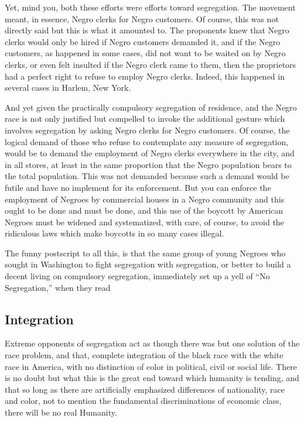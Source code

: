 \documentclass[letterpaper,10pt,english]{jupyterBook}
\begin{document}
\sphinxAtStartPar
Yet, mind you, both these efforts were efforts toward segregation. The movement meant, in essence, Negro clerks for Negro customers. Of course, this was not directly said but this is what it amounted to. The proponents knew that Negro clerks would only be hired if Negro customers demanded it, and if the Negro customers, as happened in some cases, did not want to be waited on by Negro clerks, or even felt insulted if the Negro clerk came to them, then the proprietors had a perfect right to refuse to employ Negro clerks. Indeed, this happened in several cases in Harlem, New York.

\sphinxAtStartPar
And yet given the practically compulsory segregation of residence, and the Negro race is not only justified but compelled to invoke the additional gesture which involves segregation by asking Negro clerks for Negro customers. Of course, the logical demand of those who refuse to contemplate any measure of segregation, would be to demand the employment of Negro clerks everywhere in the city, and in all stores, at least in the same proportion that the Negro population bears to the total population. This was not demanded because such a demand would be futile and have no implement for its enforcement. But you can enforce the employment of Negroes by commercial houses in a Negro community and this ought to be done and must be done, and this use of the boycott by American Negroes must be widened and systematized, with care, of course, to avoid the ridiculous laws which make boycotts in so many cases illegal.

\sphinxAtStartPar
The funny postscript to all this, is that the same group of young Negroes who sought in Washington to fight segregation with segregation, or better to build a decent living on compulsory segregation, immediately set up a yell of “No Segregation,” when they read 


\subsection{Integration}
\label{\detokenize{Volumes/41/04/segregation_in_the_north:integration}}
\sphinxAtStartPar
Extreme opponents of segregation act as though there was but one solution of the race problem, and that, complete integration of the black race with the white race in America, with no distinction of color in political, civil or social life. There is no doubt but what this is the great end toward which humanity is tending, and that so long as there are artificially emphasized differences of nationality, race and color, not to mention the fundamental discriminations of economic class, there will be no real Humanity.
\end{document}
